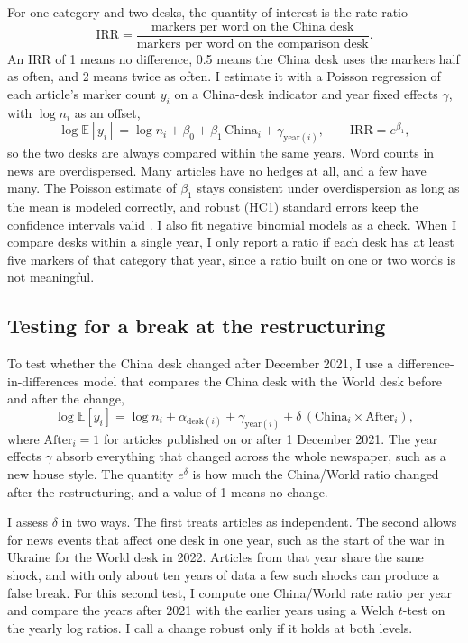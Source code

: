 \documentclass[11pt]{article}
\begin{document}
For one category and two desks, the quantity of interest is the rate ratio
\[
\text{IRR} = \frac{\text{markers per word on the China desk}}{\text{markers per word on the comparison desk}}.
\]
An IRR of 1 means no difference, 0.5 means the China desk uses the markers half as often, and 2 means twice as often. I estimate it with a Poisson regression of each article's marker count $y_i$ on a China-desk indicator and year fixed effects $\gamma$, with $\log n_i$ as an offset,
\[
\log \mathbb{E}[y_i] = \log n_i + \beta_0 + \beta_1\,\text{China}_i + \gamma_{\text{year}(i)}, \qquad \text{IRR} = e^{\beta_1},
\]
so the two desks are always compared within the same years. Word counts in news are overdispersed. Many articles have no hedges at all, and a few have many. The Poisson estimate of $\beta_1$ stays consistent under overdispersion as long as the mean is modeled correctly, and robust (HC1) standard errors keep the confidence intervals valid \cite{wooldridge,santos}. I also fit negative binomial models as a check. When I compare desks within a single year, I only report a ratio if each desk has at least five markers of that category that year, since a ratio built on one or two words is not meaningful.

\subsection{Testing for a break at the restructuring}

To test whether the China desk changed after December 2021, I use a difference-in-differences model that compares the China desk with the World desk before and after the change,
\[
\log \mathbb{E}[y_i] = \log n_i + \alpha_{\text{desk}(i)} + \gamma_{\text{year}(i)} + \delta\,(\text{China}_i \times \text{After}_i),
\]
where $\text{After}_i = 1$ for articles published on or after 1 December 2021. The year effects $\gamma$ absorb everything that changed across the whole newspaper, such as a new house style. The quantity $e^{\delta}$ is how much the China/World ratio changed after the restructuring, and a value of 1 means no change.

I assess $\delta$ in two ways. The first treats articles as independent. The second allows for news events that affect one desk in one year, such as the start of the war in Ukraine for the World desk in 2022. Articles from that year share the same shock, and with only about ten years of data a few such shocks can produce a false break. For this second test, I compute one China/World rate ratio per year and compare the years after 2021 with the earlier years using a Welch $t$-test on the yearly log ratios. I call a change robust only if it holds at both levels.
\end{document}
